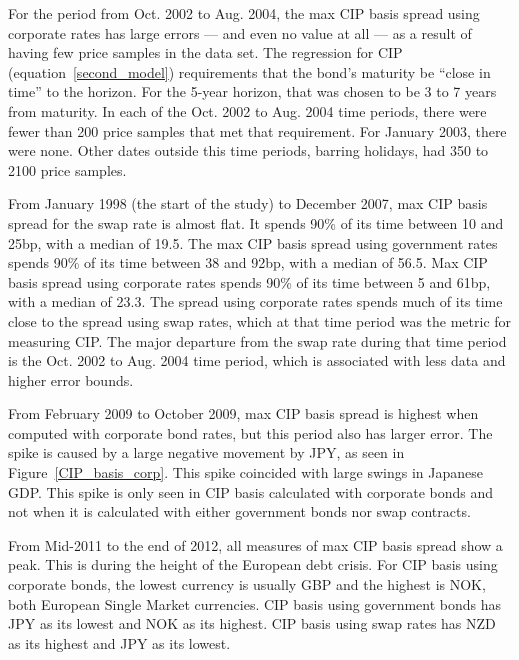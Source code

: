 

For the period from Oct. 2002 to Aug. 2004, the max CIP basis spread using corporate rates has large errors --- and even no value at all --- as a result of having few price samples in the data set.   The regression for CIP (equation~\eqref{second_model}) requirements that the bond's maturity be ``close in time'' to the horizon.  For the 5-year horizon, that was chosen to be 3 to 7 years from maturity.  In each of the Oct. 2002 to Aug. 2004 time periods, there were fewer than 200 price samples that met that requirement.  For January 2003, there were none.  Other dates outside this time periods, barring holidays, had 350 to 2100 price samples.   

From January 1998 (the start of the study) to December 2007, max CIP basis spread for the swap rate is almost flat.  It spends 90\% of its time between 10 and 25bp, with a median of 19.5.  The max CIP basis spread using government rates spends 90\% of its time between 38 and 92bp, with a median of 56.5.  Max CIP basis spread using corporate rates spends 90\% of its time between 5 and 61bp, with a median of 23.3.  The spread using corporate rates spends much of its time close to the spread using swap rates, which at that time period was the metric for measuring CIP.  The major departure from the swap rate during that time period is the Oct. 2002 to Aug. 2004 time period, which is associated with less data and higher error bounds.

From February 2009 to October 2009, max CIP basis spread is highest when computed with corporate bond rates, but this period also has larger error.  The spike is caused by a large negative movement by JPY, as seen in Figure~\ref{CIP_basis_corp}.  This spike coincided with large swings in Japanese GDP.  This spike is only seen in CIP basis calculated with corporate bonds and not when it is calculated with either government bonds nor swap contracts.  

From Mid-2011 to the end of 2012, all measures of max CIP basis spread show a peak.  This is during the height of the European debt crisis.  For CIP basis using corporate bonds, the lowest currency is usually GBP and the highest is NOK, both European Single Market currencies.  CIP basis using government bonds has JPY as its lowest and NOK as its highest.  CIP basis using swap rates has NZD as its highest and JPY as its lowest.


